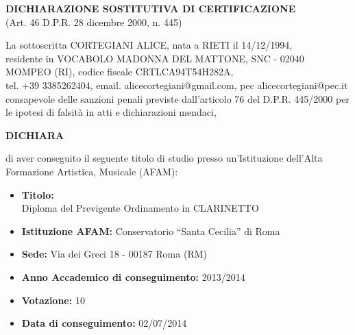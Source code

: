 \documentclass[a4paper,11pt]{article}
\begin{document}
\begin{center}
{\Large\textbf{DICHIARAZIONE SOSTITUTIVA DI CERTIFICAZIONE}}\\
{\large (Art. 46 D.P.R. 28 dicembre 2000, n. 445)}
\end{center}

\vspace{1cm}

\noindent La sottoscritta CORTEGIANI ALICE, nata a RIETI il 14/12/1994,\\
residente in VOCABOLO MADONNA DEL MATTONE, SNC - 02040 MOMPEO (RI), codice fiscale CRTLCA94T54H282A,\\
tel. +39 3385262404, email. alicecortegiani@gmail.com, pec alicecortegiani@pec.it\\
consapevole delle sanzioni penali previste dall'articolo 76 del D.P.R. 445/2000 per le ipotesi di falsità in atti e dichiarazioni mendaci,

\vspace{0.5cm}

\begin{center}
{\large\textbf{DICHIARA}}
\end{center}

\vspace{0.5cm}

\noindent di aver conseguito il seguente titolo di studio presso un'Istituzione dell'Alta Formazione Artistica, Musicale (AFAM):

\vspace{0.5cm}

\begin{itemize}
\item\textbf{Titolo:} \\
Diploma del Previgente Ordinamento in CLARINETTO
\vspace{0.3cm}
\item\textbf{Istituzione AFAM:} Conservatorio ``Santa Cecilia'' di Roma
\vspace{0.3cm}
\item\textbf{Sede:} Via dei Greci 18 - 00187 Roma (RM)
\vspace{0.3cm}
\item\textbf{Anno Accademico di conseguimento:} 2013/2014
\vspace{0.3cm}
\item\textbf{Votazione:} 10
\vspace{0.3cm}
\item\textbf{Data di conseguimento:} 02/07/2014
\end{itemize}
\end{document}
